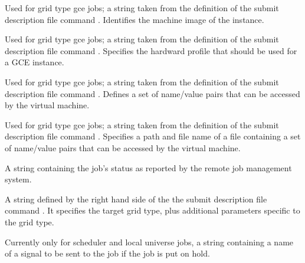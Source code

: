 \begin{description}
\item[\AdAttr{GceImage}:] 
Used for grid type gce jobs;
a string taken from the definition of the submit description file command
.
Identifies the machine image of the instance.

\item[\AdAttr{GceMachineType}:] 
Used for grid type gce jobs;
a string taken from the definition of the submit description file command
.
Specifies the hardward profile that should be used for a GCE instance.

\item[\AdAttr{GceMetadata}:] 
Used for grid type gce jobs;
a string taken from the definition of the submit description file command
.
Defines a set of name/value pairs that can be accessed by the virtual machine.

\item[\AdAttr{GceMetadataFile}:] 
Used for grid type gce jobs;
a string taken from the definition of the submit description file command
.
Specifies a path and file name of a file containing 
a set of name/value pairs that can be accessed by the virtual machine.

\item[\AdAttr{GridJobStatus}:] A string containing the job's status as
reported by the remote job management system.

\item[\AdAttr{GridResource}:] A string defined by the right hand side
of the the submit description file command .
It specifies the target grid type, plus additional parameters
specific to the grid type.

\item[\AdAttr{HoldKillSig}:]    Currently only for scheduler and local
universe jobs,
a string containing a name of
a signal to be sent to the job if the job is put on hold.


\end{description}
